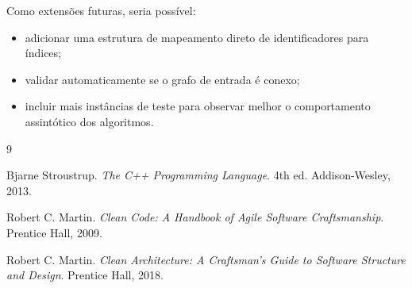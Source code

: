\documentclass[12pt,a4paper]{article}
\begin{document}
Como extensões futuras, seria possível:

\begin{itemize}[noitemsep]
    \item adicionar uma estrutura de mapeamento direto de identificadores para
          índices;
    \item validar automaticamente se o grafo de entrada é conexo;
    \item incluir mais instâncias de teste para observar melhor o comportamento
          assintótico dos algoritmos.
\end{itemize}

\begin{thebibliography}{9}

Bjarne Stroustrup.
\textit{The C++ Programming Language}.
4th ed.
Addison-Wesley, 2013.

Robert C. Martin.
\textit{Clean Code: A Handbook of Agile Software Craftsmanship}.
Prentice Hall, 2009.

Robert C. Martin.
\textit{Clean Architecture: A Craftsman's Guide to Software Structure and Design}.
Prentice Hall, 2018.

\end{thebibliography}
\end{document}

